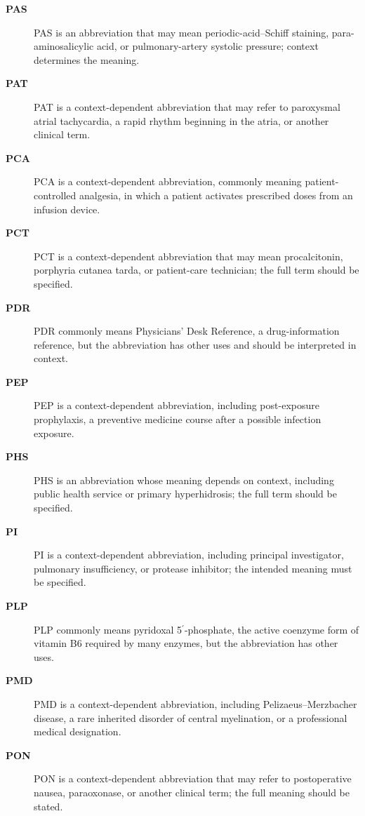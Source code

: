 \begin{description}
\item[\textbf{PAS}] PAS is an abbreviation that may mean periodic-acid–Schiff staining, para-aminosalicylic acid, or pulmonary-artery systolic pressure; context determines the meaning.

\item[\textbf{PAT}] PAT is a context-dependent abbreviation that may refer to paroxysmal atrial tachycardia, a rapid rhythm beginning in the atria, or another clinical term.

\item[\textbf{PCA}] PCA is a context-dependent abbreviation, commonly meaning patient-controlled analgesia, in which a patient activates prescribed doses from an infusion device.

\item[\textbf{PCT}] PCT is a context-dependent abbreviation that may mean procalcitonin, porphyria cutanea tarda, or patient-care technician; the full term should be specified.

\item[\textbf{PDR}] PDR commonly means Physicians’ Desk Reference, a drug-information reference, but the abbreviation has other uses and should be interpreted in context.

\item[\textbf{PEP}] PEP is a context-dependent abbreviation, including post-exposure prophylaxis, a preventive medicine course after a possible infection exposure.

\item[\textbf{PHS}] PHS is an abbreviation whose meaning depends on context, including public health service or primary hyperhidrosis; the full term should be specified.

\item[\textbf{PI}] PI is a context-dependent abbreviation, including principal investigator, pulmonary insufficiency, or protease inhibitor; the intended meaning must be specified.

\item[\textbf{PLP}] PLP commonly means pyridoxal 5$^{\prime}$-phosphate, the active coenzyme form of vitamin B6 required by many enzymes, but the abbreviation has other uses.

\item[\textbf{PMD}] PMD is a context-dependent abbreviation, including Pelizaeus–Merzbacher disease, a rare inherited disorder of central myelination, or a professional medical designation.

\item[\textbf{PON}] PON is a context-dependent abbreviation that may refer to postoperative nausea, paraoxonase, or another clinical term; the full meaning should be stated.


\end{description}
